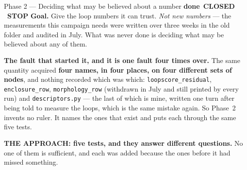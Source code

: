 \documentclass[11pt,a4paper]{article}
\newcommand{\code}[1]{\texttt{#1}}
\newcommand{\dn}{\textcolor{good}{\textbf{done}}}
\newcommand{\stopp}{\textcolor{bad!30!white}{\textbf{STOP}}}
\begin{document}
\begin{phasebox}{Phase 2 --- Deciding what may be believed about a number \hfill \dn\ \textbf{CLOSED} \ \stopp}
\textbf{Goal.} Give the loop numbers it can trust. \emph{Not new numbers} --- the measurements this
campaign needs were written over three weeks in the old folder and audited in July. What was never
done is deciding what may be believed about any of them.

\textbf{The fault that started it, and it is one fault four times over.} The same quantity acquired
\textbf{four names, in four places, on four different sets of nodes}, and nothing recorded which was
which: \code{loopscore\_residual}, \code{enclosure\_row}, \code{morphology\_row} (withdrawn in July
and still printed by every run) and \code{descriptors.py} --- the last of which is mine, written one
turn after being told to measure the loops, which is the same mistake again. So Phase~2 invents no
ruler. It names the ones that exist and puts each through the same five tests.

\medskip
\textbf{THE APPROACH: five tests, and they answer different questions.} No one of them is
sufficient, and each was added because the ones before it had missed something.


\end{phasebox}
\end{document}
